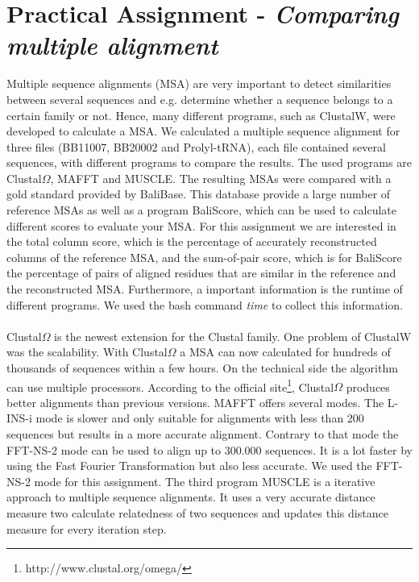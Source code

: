 \documentclass[%
   10pt,              %
   nenglish,           %
   a4paper,           %
   DIV11,             %
]{scrartcl}%
\begin{document}
\section*{Practical Assignment - \textsl{Comparing multiple alignment}}
Multiple sequence alignments (MSA) are very important to detect similarities between several 
sequences and e.g. determine whether a sequence belongs to a certain family or not. Hence, many 
different programs, such as ClustalW, were developed to calculate a MSA. We calculated a multiple 
sequence alignment for three files (BB11007, BB20002 and Prolyl-tRNA), each file contained several 
sequences, with different programs 
to compare the results. The used programs are Clustal$\Omega$\cite{Sievers539}, MAFFT\cite{Katoh1} 
and MUSCLE\cite{Edgar1, Edgar2}. The resulting MSAs were compared with a gold standard provided by 
BaliBase\cite{Bahr1}. This database provide a large number of reference MSAs as well as a program 
\grqq BaliScore\grqq , which can be used to calculate different scores to evaluate your MSA. For 
this assignment we are interested in the total column score, which is the percentage of accurately 
reconstructed columns of the reference MSA, and the sum-of-pair score, which is for BaliScore the 
percentage of pairs of aligned residues that are similar in the reference and the reconstructed 
MSA. Furthermore, a important information is the runtime of different programs. We used the bash 
command \textit{time} to collect this information.\\
\\
\noindent Clustal$\Omega$ is the newest extension for the Clustal family. One problem of ClustalW 
was the scalability. With Clustal$\Omega$ a MSA can now calculated for hundreds of thousands of 
sequences within a few hours. On the technical side the algorithm can use multiple processors. 
According to the official site\footnote{http://www.clustal.org/omega/}, Clustal$\Omega$ produces 
better alignments than previous versions. MAFFT offers several modes. The L-INS-i mode is 
slower and only suitable for alignments with less than 200 sequences but results in a more accurate 
alignment. Contrary to that mode the FFT-NS-2 mode can be used to align up to 300.000 sequences. It 
is a lot faster by using the Fast Fourier Transformation but also less accurate. We used the 
FFT-NS-2 mode for this assignment. The third program MUSCLE is a iterative approach to multiple 
sequence alignments. It uses a very accurate distance measure two calculate relatedness of two 
sequences and updates this distance measure for every iteration step.\\
\end{document}
